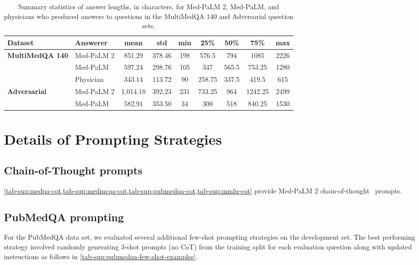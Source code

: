 \begin{table}[]
\small
\centering
\caption{Summary statistics of answer lengths, in characters, for Med-PaLM 2, Med-PaLM, and physicians who produced answers to questions in the MultiMedQA 140 and Adversarial question sets.}
\label{tab-sup:8}
\vspace{3pt}
\begin{tabular}{l|lccccccc}
\toprule
\textbf{Dataset} & \textbf{Answerer} & \textbf{mean} & \textbf{std} & \textbf{min} & \textbf{25\%} & \textbf{50\%} & \textbf{75\%} & \textbf{max} \\ \midrule
\multirow{3}{*}{\textbf{MultiMedQA 140}} & Med-PaLM 2 & 851.29   & 378.46 & 198 & 576.5  & 794   & 1085    & 2226 \\
                                         & Med-PaLM   & 597.24   & 298.76 & 105 & 347    & 565.5 & 753.25  & 1280 \\
                                         & Physician  & 343.14   & 113.72 & 90  & 258.75 & 337.5 & 419.5   & 615  \\
\multirow{2}{*}{\textbf{Adversarial}}    & Med-PaLM 2 & 1,014.18 & 392.23 & 231 & 733.25 & 964   & 1242.25 & 2499 \\
                                         & Med-PaLM   & 582.91   & 353.50 & 34  & 300    & 518   & 840.25  & 1530  \\ \bottomrule
\end{tabular}
\end{table}





\pagebreak
\section{Details of Prompting Strategies}

\subsection{Chain-of-Thought prompts}
\label{sec-app:chain-of-thought-prompts}

\cref{tab-sup:medqa-cot,tab-sup:medmcqa-cot,tab-sup:pubmedqa-cot,tab-sup:mmlu-cot} provide Med-PaLM 2 chain-of-thought~\cite{wei2022chain} prompts.


\subsection{PubMedQA prompting}
\label{sec-sup:pubmedqa-extra-prompting}
For the PubMedQA data set, we evaluated several additional few-shot prompting strategies on the development set. The best performing strategy involved randomly generating 3-shot prompts (no CoT) from the training split for each evaluation question along with updated instructions as follows in \cref{tab-sup:pubmedqa-few-shot-examples}.

